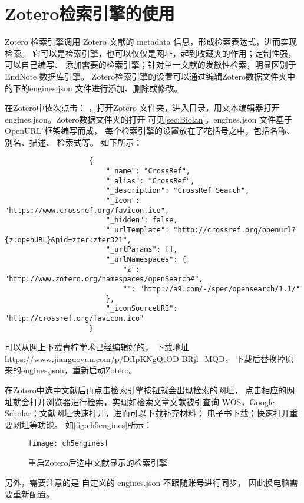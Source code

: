\documentclass[cn,11pt,chinese]{elegantbook}
\begin{document}
				

		\section{Zotero检索引擎的使用}\label{sec:Engines}
			Zotero 检索引擎调用 Zotero 文献的 metadata 信息，形成检索表达式，进而实现检索。
			它可以是检索引擎，也可以仅仅是网址，起到收藏夹的作用；定制性强，可以自己编写、
			添加需要的检索引擎；针对单一文献的发散性检索，明显区别于 EndNote 数据库引擎。
			Zotero检索引擎的设置可以通过编辑Zotero数据文件夹中的下的engines.json
			文件进行添加、删除或修改。

			在Zotero中依次点击：
			，打开Zotero 
			文件夹，进入目录，用文本编辑器打开engines.json。Zotero数据文件夹的打开
			可见\cref{sec:Biolan}。engines.json 文件基于 OpenURL 框架编写而成，
			每个检索引擎的设置放在了花括号之中，包括名称、别名、描述、
			检索式等。
			如下所示：
				\begin{lstlisting}
					{
						"_name": "CrossRef",
						"_alias": "CrossRef",
						"_description": "CrossRef Search",
						"_icon": "https://www.crossref.org/favicon.ico",
						"_hidden": false,
						"_urlTemplate": "http://crossref.org/openurl?{z:openURL}&pid=zter:zter321",
						"_urlParams": [],
						"_urlNamespaces": {
							"z": "http://www.zotero.org/namespaces/openSearch#",
							"": "http://a9.com/-/spec/opensearch/1.1/"
						},
						"_iconSourceURI": "http://crossref.org/favicon.ico"
					}

				\end{lstlisting}
			
			
				可以从网上下载\href{https://www.zhihu.com/people/iseex/answers
			}{青柠学术}已经编辑好的，
			下载地址\url{https://www.jianguoyun.com/p/DfIpKNgQtOD-BRjl_MQD}，
			下载后替换掉原来的engines.json，重新启动Zotero。

			在Zotero中选中文献后再点击检索引擎按钮就会出现检索的网址，
			点击相应的网址就会打开浏览器进行检索，实现如检索文章文献被引查询
			WOS，Google Scholar；文献网址快速打开，进而可以下载补充材料；
			电子书下载；快速打开重要网址等功能。	
			如\autoref{fig:ch5engines}所示：
				\begin{figure}[ht]
					\centering
					\texttt{[image: ch5engines]}
					\caption{重启Zotero后选中文献显示的检索引擎}
					\label{fig:ch5engines}
				\end{figure}
			另外，需要注意的是
		自定义的 engines.json 不跟随账号进行同步，
		因此换电脑需要重新配置。
\end{document}
